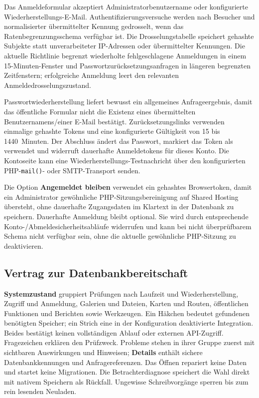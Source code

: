 \documentclass[11pt,a4paper]{article}
\newcommand{\ui}[1]{\textbf{#1}}
\newcommand{\codeword}[1]{\nolinkurl{#1}}
\begin{document}
Das Anmeldeformular akzeptiert Administratorbenutzername oder konfigurierte
Wieder\-her\-stel\-lungs-E-Mail. Authentifizierungsversuche werden nach Besucher
und normalisierter übermittelter Kennung gedrosselt, wenn das
Ratenbegrenzungsschema verfügbar ist. Die Drosselungstabelle speichert gehashte
Subjekte statt unverarbeiteter IP-Adressen oder übermittelter Kennungen. Die
aktuelle Richtlinie begrenzt wiederholte fehlgeschlagene Anmeldungen in einem
15-Minuten-Fenster und Passwortzurücksetzungsanfragen in längeren begrenzten
Zeitfenstern; erfolgreiche Anmeldung leert den relevanten
Anmeldedrosselungszustand.

Passwortwiederherstellung liefert bewusst ein allgemeines Anfrageergebnis, damit
das öffentliche Formular nicht die Existenz eines übermittelten
Benutzernamens/einer E-Mail bestätigt. Zurücksetzungslinks verwenden einmalige
gehashte Tokens und eine konfigurierte Gültigkeit von 15 bis 1440~Minuten. Der
Abschluss ändert das Passwort, markiert das Token als verwendet und widerruft
dauerhafte Anmeldetokens für dieses Konto. Die Kontoseite kann eine
Wiederherstellungs-Testnachricht über den konfigurierten PHP-\codeword{mail()}-
oder SMTP-Transport senden.

Die Option \ui{Angemeldet bleiben} verwendet ein gehashtes Browsertoken, damit
ein Administrator gewöhnliche PHP-Sitzungsbereinigung auf Shared Hosting
übersteht, ohne dauerhafte Zugangsdaten im Klartext in der Datenbank zu
speichern. Dauerhafte Anmeldung bleibt optional. Sie wird durch entsprechende
Konto-/Abmeldesicherheitsabläufe widerrufen und kann bei nicht überprüfbarem
Schema nicht verfügbar sein, ohne die aktuelle gewöhnliche PHP-Sitzung zu
deaktivieren.
\subsection{Vertrag zur Datenbankbereitschaft}
\label{sec:db-readiness-contract}

\ui{Systemzustand} gruppiert Prüfungen nach Laufzeit und Wiederherstellung,
Zugriff und Anmeldung, Galerien und Dateien, Karten und Routen, öffentlichen
Funktionen und Berichten sowie Werkzeugen. Ein Häkchen bedeutet gefundenen
benötigten Speicher; ein Strich eine in der Konfiguration deaktivierte
Integration. Beides bestätigt keinen vollständigen Ablauf oder externen
API-Zugriff. Fragezeichen erklären den Prüfzweck. Probleme stehen in ihrer
Gruppe zuerst mit sichtbaren Auswirkungen und Hinweisen; \ui{Details} enthält
sichere Datenbankkennungen und Anfragereferenzen. Das Öffnen repariert keine
Daten und startet keine Migrationen. Die Betrachterdiagnose speichert die Wahl
direkt mit nativem Speichern als Rückfall. Ungewisse Schreibvorgänge sperren
bis zum rein lesenden Neuladen.
\end{document}
